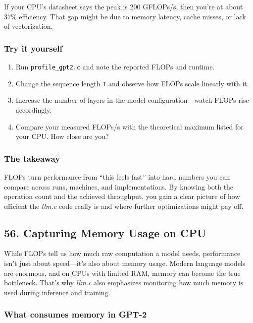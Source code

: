 \documentclass[
  letterpaper,
  DIV=11,
  numbers=noendperiod]{scrreprt}
\providecommand{\tightlist}{%
  \setlength{\itemsep}{0pt}\setlength{\parskip}{0pt}}
\begin{document}
If your CPU's datasheet says the peak is 200 GFLOPs/s, then you're at
about 37\% efficiency. That gap might be due to memory latency, cache
misses, or lack of vectorization.

\subsubsection{Try it yourself}\label{try-it-yourself-43}

\begin{enumerate}
\def\labelenumi{\arabic{enumi}.}
\tightlist
\item
  Run \texttt{profile\_gpt2.c} and note the reported FLOPs and runtime.
\item
  Change the sequence length \texttt{T} and observe how FLOPs scale
  linearly with it.
\item
  Increase the number of layers in the model configuration---watch FLOPs
  rise accordingly.
\item
  Compare your measured FLOPs/s with the theoretical maximum listed for
  your CPU. How close are you?
\end{enumerate}

\subsubsection{The takeaway}\label{the-takeaway-44}

FLOPs turn performance from ``this feels fast'' into hard numbers you
can compare across runs, machines, and implementations. By knowing both
the operation count and the achieved throughput, you gain a clear
picture of how efficient the \emph{llm.c} code really is and where
further optimizations might pay off.

\subsection{56. Capturing Memory Usage on
CPU}\label{capturing-memory-usage-on-cpu}

While FLOPs tell us how much raw computation a model needs, performance
isn't just about speed---it's also about memory usage. Modern language
models are enormous, and on CPUs with limited RAM, memory can become the
true bottleneck. That's why \emph{llm.c} also emphasizes monitoring how
much memory is used during inference and training.

\subsubsection{What consumes memory in
GPT-2}\label{what-consumes-memory-in-gpt-2}
\end{document}

